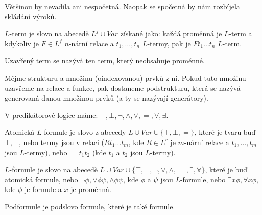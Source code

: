 \documentclass[12pt]{article}                   %
\begin{document}
        \begin{poznamka}
            Většinou by nevadila ani nespočetná. Naopak se spočetná by nám rozbíjela skládání výroků.
        \end{poznamka}

        \begin{definice}[Termy]
            $L$-term je slovo na abecedě $L^f \cup Var$ získané jako: každá proměnná je $L$-term a kdykoliv je $F \in L^f$ $n$-nární relace a $t_1, …, t_n$ $L$-termy, pak je $Ft_1…t_n$ $L$-term.
        \end{definice}

        \begin{definice}
            Uzavřený term se nazývá ten term, který neobsahuje proměnné.
        \end{definice}

        \begin{definice}[Generátory]
            Mějme strukturu a množinu (oindexovanou) prvků z ní. Pokud tuto množinu uzavřeme na relace a funkce, pak dostaneme podstrukturu, která se nazývá generovaná danou množinou prvků (a ty se nazývají generátory).
        \end{definice}


        \begin{definice}[Symboly]
            V predikátorové logice máme: $\top, \bot, \neg, \land, \lor, =, \forall, \exists$.
        \end{definice}

        \begin{definice}
            Atomická $L$-formule je slovo z abecedy $L \cup Var \cup \{\top, \bot, =\}$, které je tvaru buď $\top, \bot$, nebo termy jsou v relaci ($Rt_1…t_m$, kde $R \in L^r$ je $m$-nární relace a $t_1, …, t_m$ jsou $L$-termy), nebo $=t_1t_2$ (kde $t_1$ a $t_2$ jsou $L$-termy).
        \end{definice}

        \begin{definice}[Formule]
            $L$-formule je slovo na abecedě $L \cup Var \cup \{\top, \bot, \neg, \lor, \land, =, \exists, \forall\}$, které je buď atomická formule, nebo $\neg\phi, \lor\phi\psi, \land\phi\psi$, kde $\phi$ a $\psi$ jsou $L$-formule, nebo $\exists x\phi, \forall x\phi$, kde $\phi$ je formule a $x$ je proměnná.
        \end{definice}

        \begin{definice}[Podformule]
            Podformule je podslovo formule, které je také formule.
        \end{definice}
\end{document}
